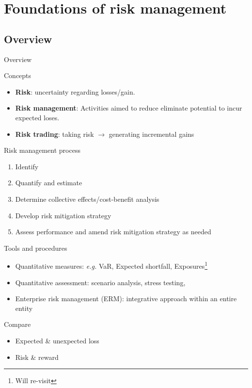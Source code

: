\section{Foundations of risk management}


\subsection{Overview}

\begin{frame}[allowframebreaks]{Overview}
\begin{block}{Concepts}
\begin{itemize}
\item \textbf{Risk}: uncertainty regarding losses/gain.
\item \textbf{Risk management}: Activities aimed to reduce eliminate potential to incur expected loses.
\item \textbf{Risk trading}: taking risk $\to$ generating incremental gains
\end{itemize}
\end{block}

\begin{block}{Risk management process}
\begin{enumerate}
\item Identify 
\item Quantify and estimate
\item Determine collective effects/cost-benefit analysis
\item Develop risk mitigation strategy
\item Assess performance and amend risk mitigation strategy as needed
\end{enumerate}
\end{block}

\begin{block}{Tools and procedures}
\begin{itemize}
\item Quantitative measures: \textit{e.g.} VaR, Expected shortfall, Exposures\footnote{Will re-visit}  
\item Quantitative assessment: scenario analysis, stress testing, 
\item Enterprise risk management (ERM): integrative approach within an entire entity
\end{itemize}
\end{block}

\begin{block}{Compare}
\begin{itemize}
\item Expected \& unexpected loss
\item Risk \& reward
\end{itemize}
\end{block}


\end{frame}
